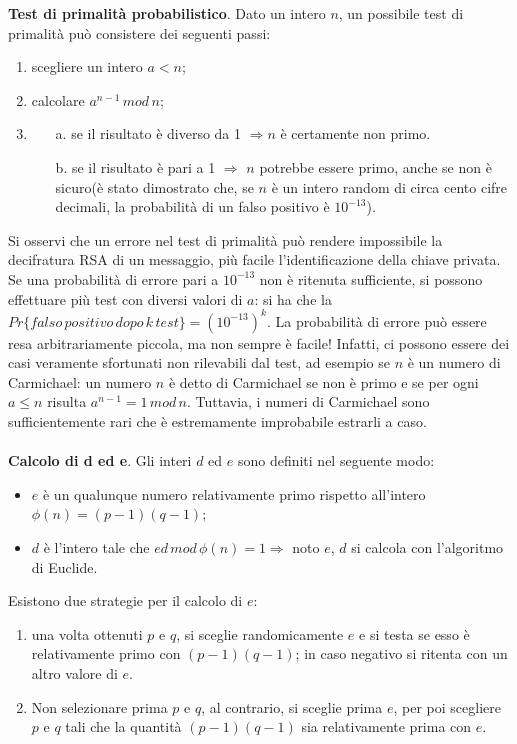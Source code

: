 \textbf{Test di primalità probabilistico}. Dato un intero $n$, un possibile test di primalità può consistere dei seguenti passi: \begin{enumerate}
\item scegliere un intero $a<n$;
\item calcolare $a^{n-1} \, mod \,n$;
\item \begin{enumerate} \item [a.] se il risultato è diverso da 1 $ \Rightarrow n$ è certamente non primo.
\item [b.] se il risultato è pari a 1 $\Rightarrow $ $n$ potrebbe essere primo, anche se non è sicuro(è stato dimostrato che, se $n$ è un intero random di circa cento cifre decimali, la probabilità di un falso positivo è $10^{-13}$).
\end{enumerate}
\end{enumerate}
Si osservi che un errore nel test di primalità può  rendere impossibile la decifratura RSA di un messaggio, più facile l'identificazione della chiave privata. \\Se una probabilità di errore pari a $10^{-13}$ non è ritenuta sufficiente, si possono effettuare più test con diversi valori di $a$: si ha che la $Pr \{falso \, positivo \, dopo \, k \, test \} = (10^{-13})^k$. La probabilità di errore può essere resa arbitrariamente piccola, ma non sempre è facile! Infatti, ci possono essere dei casi veramente sfortunati non rilevabili dal test, ad esempio se $n$ è un numero di Carmichael: un numero $n$ è detto di Carmichael se non è primo e se per ogni $a \le n$ risulta $a^{n-1} = 1 \, mod \, n$. Tuttavia, i numeri di Carmichael sono sufficientemente rari che è estremamente improbabile estrarli a caso. \\ \\
\textbf{Calcolo di d ed e}. Gli interi $d$ ed $e$ sono definiti nel seguente modo: \begin{itemize}
\item $e$ è un qualunque numero relativamente primo rispetto all'intero $\phi(n) = (p-1)(q-1)$;
\item $d$ è l'intero tale che $ed \, mod \, \phi(n) = 1 \Rightarrow$ noto $e$, $d$ si calcola con l'algoritmo di Euclide. 
\end{itemize}
Esistono due strategie per il calcolo di $e$:
\begin{enumerate}
\item una volta ottenuti $p$ e $q$, si sceglie randomicamente $e$ e si testa se esso è relativamente primo con $(p-1)(q-1)$; in caso negativo si ritenta con un altro valore di $e$.
\item Non selezionare prima $p$ e $q$, al contrario, si sceglie prima $e$, per poi scegliere $p$ e $q$ tali che la quantità $(p-1)(q-1)$ sia relativamente prima con $e$.
\end{enumerate}
